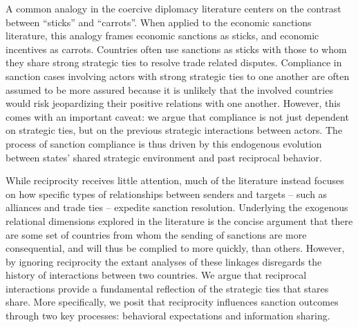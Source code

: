 	
A common analogy in the coercive diplomacy literature centers on the contrast between ``sticks'' and ``carrots''. When applied to the economic sanctions literature, this analogy frames economic sanctions as sticks, and economic incentives as carrots. Countries often use sanctions as sticks with those to whom they share strong strategic ties to resolve trade related disputes.  Compliance in sanction cases involving actors with strong strategic ties to one another are often assumed to be more assured because it is unlikely that the involved countries would risk jeopardizing their positive relations with one another. However, this comes with an important caveat: we argue that compliance is not just dependent on strategic ties, but on the previous strategic interactions between actors. The process of sanction compliance is thus driven by this endogenous evolution between states' shared strategic environment and past reciprocal behavior.

	
While reciprocity receives little attention, much of the literature instead focuses on how specific types of relationships between senders and targets -- such as alliances and trade ties -- expedite sanction resolution. Underlying the exogenous relational dimensions explored in the literature is the concise argument that there are some set of countries from whom the sending of sanctions are more consequential, and will thus be complied to more quickly, than others. However, by ignoring reciprocity the extant analyses of these linkages disregards the history of interactions between two countries. We argue that reciprocal interactions provide a fundamental reflection of the strategic ties that stares share. More specifically, we posit that reciprocity influences sanction outcomes through two key processes: behavioral expectations and information sharing. 



